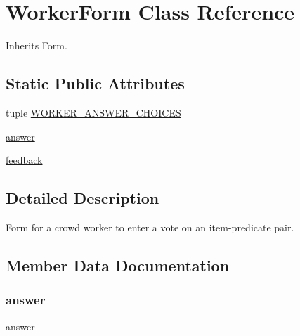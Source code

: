 \hypertarget{classdynamicfilterapp_1_1forms_1_1_worker_form}{}\section{Worker\+Form Class Reference}
\label{classdynamicfilterapp_1_1forms_1_1_worker_form}


Inherits Form.

\subsection*{Static Public Attributes}
\begin{DoxyCompactItemize}
\item 
tuple \mbox{\hyperlink{classdynamicfilterapp_1_1forms_1_1_worker_form_a82a7fc5c5e889c4eb0460d3f1638425b}{W\+O\+R\+K\+E\+R\+\_\+\+A\+N\+S\+W\+E\+R\+\_\+\+C\+H\+O\+I\+C\+ES}}
\item 
\mbox{\hyperlink{classdynamicfilterapp_1_1forms_1_1_worker_form_a8c4d9ee8d4f82d724070b97e70b9c4e5}{answer}}
\item 
\mbox{\hyperlink{classdynamicfilterapp_1_1forms_1_1_worker_form_aecc50b4643d1ea45de7afe20e729c160}{feedback}}
\end{DoxyCompactItemize}


\subsection{Detailed Description}
\begin{DoxyVerb}Form for a crowd worker to enter a vote on an item-predicate pair.
\end{DoxyVerb}
 

\subsection{Member Data Documentation}
\mbox{\label{classdynamicfilterapp_1_1forms_1_1_worker_form_a8c4d9ee8d4f82d724070b97e70b9c4e5}} 
\subsubsection{\texorpdfstring{answer}{answer}}
{\footnotesize\ttfamily answer\hspace{0.3cm}{\ttfamily [static]}}

